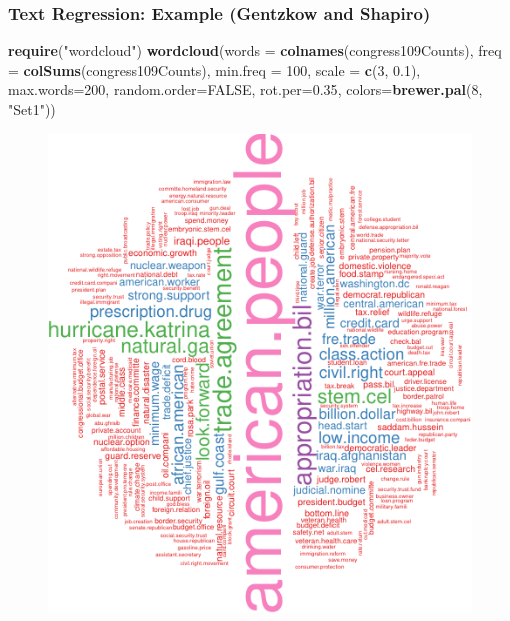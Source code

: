\documentclass[
  shownotes,
  xcolor={svgnames},
  hyperref={colorlinks,citecolor=DarkBlue,linkcolor=DarkRed,urlcolor=DarkBlue}
  , aspectratio=169]{beamer}
\newenvironment{Shaded}{\begin{snugshade}}{\end{snugshade}}
\newcommand{\DataTypeTok}[1]{\textcolor[rgb]{0.13,0.29,0.53}{#1}}
\newcommand{\DecValTok}[1]{\textcolor[rgb]{0.00,0.00,0.81}{#1}}
\newcommand{\FloatTok}[1]{\textcolor[rgb]{0.00,0.00,0.81}{#1}}
\newcommand{\KeywordTok}[1]{\textcolor[rgb]{0.13,0.29,0.53}{\textbf{#1}}}
\newcommand{\NormalTok}[1]{#1}
\newcommand{\OtherTok}[1]{\textcolor[rgb]{0.56,0.35,0.01}{#1}}
\newcommand{\StringTok}[1]{\textcolor[rgb]{0.31,0.60,0.02}{#1}}
\begin{document}
\begin{frame}[fragile]
\frametitle{Text Regression: Example (Gentzkow and Shapiro)}

\begin{scriptsize}


\begin{Shaded}
\begin{Highlighting}[]
\KeywordTok{require}\NormalTok{(}\StringTok{"wordcloud"}\NormalTok{)}
\KeywordTok{wordcloud}\NormalTok{(}\DataTypeTok{words =} \KeywordTok{colnames}\NormalTok{(congress109Counts), }
          \DataTypeTok{freq =} \KeywordTok{colSums}\NormalTok{(congress109Counts),}
          \DataTypeTok{min.freq =} \DecValTok{100}\NormalTok{,}
          \DataTypeTok{scale =} \KeywordTok{c}\NormalTok{(}\DecValTok{3}\NormalTok{, }\FloatTok{0.1}\NormalTok{), }\DataTypeTok{max.words=}\DecValTok{200}\NormalTok{, }
          \DataTypeTok{random.order=}\OtherTok{FALSE}\NormalTok{, }\DataTypeTok{rot.per=}\FloatTok{0.35}\NormalTok{, }
          \DataTypeTok{colors=}\KeywordTok{brewer.pal}\NormalTok{(}\DecValTok{8}\NormalTok{, }\StringTok{"Set1"}\NormalTok{))}
\end{Highlighting}
\end{Shaded}
\end{scriptsize}

  \begin{figure}[H] \centering
            \captionsetup{justification=centering}
              \includegraphics[scale=0.5]{figures/unnamed-chunk-3-1.pdf}
              
 \end{figure}


\end{frame}
\end{document}
